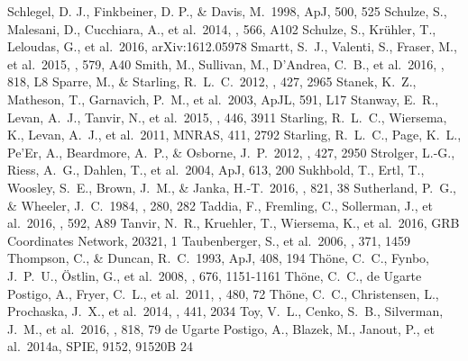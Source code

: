 \documentclass[traditabstract,longauth]{aa}
\begin{document}
\begin{thebibliography}{99}
 Schlegel, D. J., Finkbeiner, D. P., \& Davis, M.\ 1998, ApJ, 500, 525
 Schulze, S., Malesani, D., Cucchiara, A., et al.\ 2014, \aap, 566, A102 
 Schulze, S., Kr{\"u}hler, T., Leloudas, G., et al.\ 2016, arXiv:1612.05978 
 Smartt, S.~J., Valenti, S., Fraser, M., et al.\ 2015, \aap, 579, A40 
 Smith, M., Sullivan, M., D'Andrea, C.~B., et al.\ 2016, \apjl, 818, L8 
 Sparre, M., \& Starling, R.~L.~C.\ 2012, \mnras, 427, 2965 
 Stanek, K.~Z., Matheson, T., Garnavich, P.~M., et al.\ 2003, ApJL, 591, L17 
 Stanway, E.~R., Levan, A.~J., Tanvir, N., et al.\ 2015, \mnras, 446, 3911 
 Starling, R.~L.~C., Wiersema, K., Levan, A.~J., et al.\ 2011, MNRAS, 411, 2792 
 Starling, R.~L.~C., Page, K.~L., Pe'Er, A., Beardmore, A.~P., \& Osborne, J.~P.\ 2012, \mnras, 427, 2950 
 Strolger, L.-G., Riess, A.~G., Dahlen, T., et al.\ 2004, ApJ, 613, 200 
 Sukhbold, T., Ertl, T., Woosley, S.~E., Brown, J.~M., \& Janka, H.-T.\ 2016, \apj, 821, 38 
  Sutherland, P.~G., \& Wheeler, J.~C.\ 1984, \apj, 280, 282 
 Taddia, F., Fremling, C., Sollerman, J., et al.\ 2016, \aap, 592, A89 
 Tanvir, N.~R., Kruehler, T., Wiersema, K., et al.\ 2016, GRB Coordinates Network, 20321, 1 
  Taubenberger, S., et al.\ 2006, \mnras, 371, 1459 
 Thompson, C., \& Duncan, R.~C.\ 1993, ApJ, 408, 194 
 Th{\"o}ne, C.~C., Fynbo, J.~P.~U., {\"O}stlin, G., et al.\ 2008, \apj, 676, 1151-1161 
 Th{\"o}ne, C.~C., de Ugarte Postigo, A., Fryer, C.~L., et al.\ 2011, \nat, 480, 72 
 Th{\"o}ne, C.~C., Christensen, L., Prochaska, J.~X., et al.\ 2014, \mnras, 441, 2034 
 Toy, V.~L., Cenko, S.~B., Silverman, J.~M., et al.\ 2016, \apj, 818, 79 
 de Ugarte Postigo, A., Blazek, M., Janout, P., et al.\ 2014a, SPIE, 9152, 91520B 24

\end{thebibliography}
\end{document}
